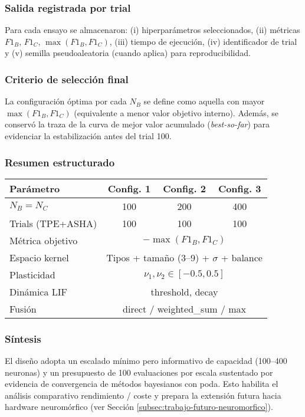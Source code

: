 \subsubsection{Salida registrada por trial}
Para cada ensayo se almacenaron: (i) hiperparámetros seleccionados, (ii) métricas $F1_B$, $F1_C$, $\max(F1_B,F1_C)$, (iii) tiempo de ejecución, (iv) identificador de trial y (v) semilla pseudoaleatoria (cuando aplica) para reproducibilidad.

\subsubsection{Criterio de selección final}
La configuración óptima por cada $N_B$ se define como aquella con mayor $\max(F1_B,F1_C)$ (equivalente a menor valor objetivo interno). Además, se conservó la traza de la curva de mejor valor acumulado (\emph{best-so-far}) para evidenciar la estabilización antes del trial 100.

\subsubsection{Resumen estructurado}
\begin{center}
\begin{tabular}{lccc}
\hline
Parámetro & Config. 1 & Config. 2 & Config. 3 \\
\hline
$N_B = N_C$ & 100 & 200 & 400 \\
Trials (TPE+ASHA) & 100 & 100 & 100 \\
Métrica objetivo & \multicolumn{3}{c}{$-\max(F1_B,F1_C)$} \\
Espacio kernel & \multicolumn{3}{c}{Tipos + tamaño (3--9) + $\sigma$ + balance} \\
Plasticidad & \multicolumn{3}{c}{$\nu_1,\nu_2 \in [-0.5,0.5]$} \\
Dinámica LIF & \multicolumn{3}{c}{threshold, decay} \\
Fusión & \multicolumn{3}{c}{direct / weighted\_sum / max} \\
\hline
\end{tabular}
\end{center}

\subsubsection{Síntesis}
El diseño adopta un escalado mínimo pero informativo de capacidad (100–400 neuronas) y un presupuesto de 100 evaluaciones por escala sustentado por evidencia de convergencia de métodos bayesianos con poda. Esto habilita el análisis comparativo rendimiento / coste y prepara la extensión futura hacia hardware neuromórfico (ver Sección \ref{subsec:trabajo-futuro-neuromorfico}).

